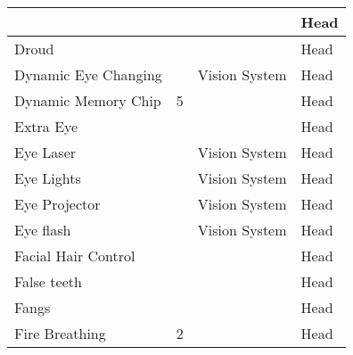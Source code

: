\documentclass[twoside]{book}
\begin{document}
\begin{longtable}{p{1.25in}p{2em}ll}
  &
  
  &
  
  &
   Head 
  \tabularnewline
  \hline
      
  \raggedright
           Droud 
  &
  
  &
  
  &
   Head 
  \tabularnewline
  \hline
      
  \raggedright
           Dynamic Eye Changing 
  &
  
  &
   Vision System 
  &
   Head 
  \tabularnewline
  \hline
      
  \raggedright
           Dynamic Memory Chip 
  &
   5 
  &
  
  &
   Head 
  \tabularnewline
  \hline
      
  \raggedright
           Extra Eye 
  &
  
  &
  
  &
   Head 
  \tabularnewline
  \hline
      
  \raggedright
           Eye Laser 
  &
  
  &
   Vision System 
  &
   Head 
  \tabularnewline
  \hline
      
  \raggedright
           Eye Lights 
  &
  
  &
   Vision System 
  &
   Head 
  \tabularnewline
  \hline
      
  \raggedright
           Eye Projector 
  &
  
  &
   Vision System 
  &
   Head 
  \tabularnewline
  \hline
      
  \raggedright
           Eye flash 
  &
  
  &
   Vision System 
  &
   Head 
  \tabularnewline
  \hline
      
  \raggedright
           Facial Hair Control 
  &
  
  &
  
  &
   Head 
  \tabularnewline
  \hline
      
  \raggedright
           False teeth 
  &
  
  &
  
  &
   Head 
  \tabularnewline
  \hline
      
  \raggedright
           Fangs 
  &
  
  &
  
  &
   Head 
  \tabularnewline
  \hline
      
  \raggedright
           Fire Breathing 
  &
   2 
  &
  
  &
   Head 
  \tabularnewline
  \hline
      

\end{longtable}
\end{document}
